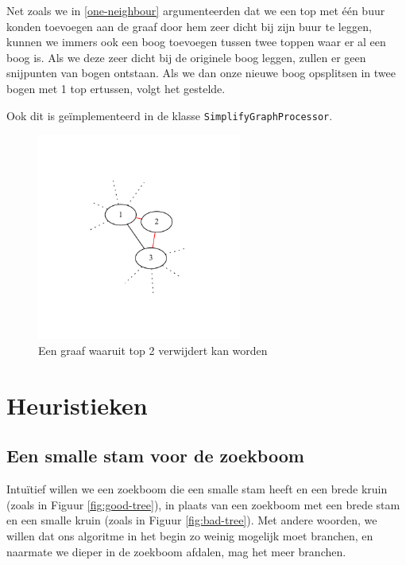 \documentclass{article}
\begin{document}
Net zoals we in \ref{one-neighbour} argumenteerden dat we een top met \'e\'en
buur konden toevoegen aan de graaf door hem zeer dicht bij zijn buur te leggen,
kunnen we immers ook een boog toevoegen tussen twee toppen waar er al een boog
is. Als we deze zeer dicht bij de originele boog leggen, zullen er geen
snijpunten van bogen ontstaan. Als we dan onze nieuwe boog opsplitsen in twee
bogen met 1 top ertussen, volgt het gestelde.
\newline

Ook dit is ge\"implementeerd in de klasse \verb#SimplifyGraphProcessor#.

\begin{figure}
\begin{center}
\includegraphics[width=0.6\textwidth]{images/two-neighbours-connected.pdf}
\caption{Een graaf waaruit top 2 verwijdert kan worden}
\label{fig:two-neighbours-connected}
\end{center}
\end{figure}

\section{Heuristieken}

\subsection{Een smalle stam voor de zoekboom}
Intu\"itief willen we een zoekboom die een smalle stam heeft en een brede kruin
(zoals in Figuur \ref{fig:good-tree}), in plaats van een zoekboom met een brede
stam en een smalle kruin (zoals in Figuur \ref{fig:bad-tree}). Met andere
woorden, we willen dat ons algoritme in het begin zo weinig mogelijk moet
branchen, en naarmate we dieper in de zoekboom afdalen, mag het meer branchen.
\newline
\end{document}
